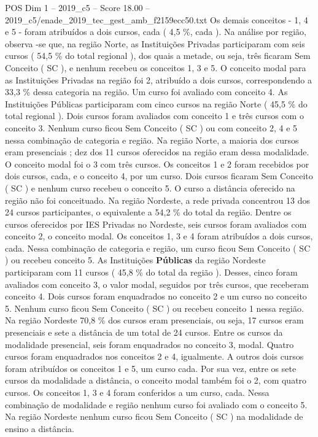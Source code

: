 \begin{textsample}{POS Dim 1 – 2019\_c5 – Score 18.00 – 2019\_c5/enade\_2019\_tec\_gest\_amb\_f2159ecc50.txt}
Os demais conceitos - 1, 4 e 5 - foram atribuídos a dois cursos, cada ( 4,5 \%, cada ).
Na análise por região, observa -se que, na região Norte, as Instituições Privadas participaram com seis cursos ( 54,5 \% do total regional ), dos quais a metade, ou seja, três ficaram Sem Conceito ( SC ), e nenhum recebeu os conceitos 1, 3 e 5.
O conceito modal para as Instituições Privadas na região foi 2, atribuído a dois cursos, correspondendo a 33,3 \% dessa categoria na região.
Um curso foi avaliado com conceito 4.
As Instituições Públicas participaram com cinco cursos na região Norte ( 45,5 \% do total regional ).
Dois cursos foram avaliados com conceito 1 e três cursos com o conceito 3.
Nenhum curso ficou Sem Conceito ( SC ) ou com conceito 2, 4 e 5 nessa combinação de categoria e região.
Na região Norte, a maioria dos cursos eram presenciais ; dez dos 11 cursos oferecidos na região eram dessa modalidade.
O conceito modal foi o 3 com três cursos.
Os conceitos 1 e 2 foram recebidos por dois cursos, cada, e o conceito 4, por um curso.
Dois cursos ficaram Sem Conceito ( SC ) e nenhum curso recebeu o conceito 5.
O curso a distância oferecido na região não foi conceituado.
Na região Nordeste, a rede privada concentrou 13 dos 24 cursos participantes, o equivalente a 54,2 \% do total da região.
Dentre os cursos oferecidos por IES Privadas no Nordeste, seis cursos foram avaliados com conceito 2, o conceito modal.
Os conceitos 1, 3 e 4 foram atribuídos a dois cursos, cada.
Nessa combinação de categoria e região, um curso ficou Sem Conceito ( SC ) ou recebeu conceito 5.
As Instituições \textbf{Públicas} da região Nordeste participaram com 11 cursos ( 45,8 \% do total da região ).
Desses, cinco foram avaliados com conceito 3, o valor modal, seguidos por três cursos, que receberam conceito 4.
Dois cursos foram enquadrados no conceito 2 e um curso no conceito 5.
Nenhum curso ficou Sem Conceito ( SC ) ou recebeu conceito 1 nessa região.
Na região Nordeste 70,8 \% dos cursos eram presenciais, ou seja, 17 cursos eram presenciais e sete a distância de um total de 24 cursos.
Entre os cursos da modalidade presencial, seis foram enquadrados no conceito 3, modal.
Quatro cursos foram enquadrados nos conceitos 2 e 4, igualmente.
A outros dois cursos foram atribuídos os conceitos 1 e 5, um curso cada.
Por sua vez, entre os sete cursos da modalidade a distância, o conceito modal também foi o 2, com quatro cursos.
Os conceitos 1, 3 e 4 foram conferidos a um curso, cada.
Nessa combinação de modalidade e região nenhum curso foi avaliado com o conceito 5.
Na região Nordeste nenhum curso ficou Sem Conceito ( SC ) na modalidade de ensino a distância.

\end{textsample}
